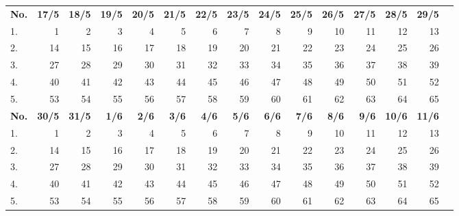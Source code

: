 \documentclass{article}
\begin{document}
\begin{table}[H]
    \centering
    \begin{tabularx}{\textwidth}{| X | r | r | r | r | r | r | r | r | r | r | r | r | r | r |}
        \Xhline{2pt}
        \textbf{No.} & \textbf{17/5} & \textbf{18/5} & \textbf{19/5} & \textbf{20/5} & \textbf{21/5} & \textbf{22/5} & \textbf{23/5} & \textbf{24/5} & \textbf{25/5} & \textbf{26/5} & \textbf{27/5} & \textbf{28/5} & \textbf{29/5} \\
        \Xhline{2pt}
        1. & 1 & 2 & 3 & 4 & 5 & 6 & 7 & 8 & 9 & 10 & 11 & 12 & 13 \\
        \hline
        2. & 14 & 15 & 16 & 17 & 18 & 19 & 20 & 21 & 22 & 23 & 24 & 25 & 26 \\
        \hline
        3. & 27 & 28 & 29 & 30 & 31 & 32 & 33 & 34 & 35 & 36 & 37 & 38 & 39 \\
        \hline
        4. & 40 & 41 & 42 & 43 & 44 & 45 & 46 & 47 & 48 & 49 & 50 & 51 & 52 \\
        \hline
        5. & 53 & 54 & 55 & 56 & 57 & 58 & 59 & 60 & 61 & 62 & 63 & 64 & 65 \\
        \Xhline{2pt}
        \textbf{No.} & \textbf{30/5} & \textbf{31/5} & \textbf{ 1/6} & \textbf{ 2/6} & \textbf{ 3/6} & \textbf{ 4/6} & \textbf{ 5/6} & \textbf{ 6/6} & \textbf{ 7/6} & \textbf{ 8/6} & \textbf{ 9/6} & \textbf{10/6} & \textbf{11/6} \\
        \Xhline{2pt}
        1. & 1 & 2 & 3 & 4 & 5 & 6 & 7 & 8 & 9 & 10 & 11 & 12 & 13 \\
        \hline
        2. & 14 & 15 & 16 & 17 & 18 & 19 & 20 & 21 & 22 & 23 & 24 & 25 & 26 \\
        \hline
        3. & 27 & 28 & 29 & 30 & 31 & 32 & 33 & 34 & 35 & 36 & 37 & 38 & 39 \\
        \hline
        4. & 40 & 41 & 42 & 43 & 44 & 45 & 46 & 47 & 48 & 49 & 50 & 51 & 52 \\
        \hline
        5. & 53 & 54 & 55 & 56 & 57 & 58 & 59 & 60 & 61 & 62 & 63 & 64 & 65 \\
        \hline
    \end{tabularx}
\end{table}
\clearpage
\end{document}
